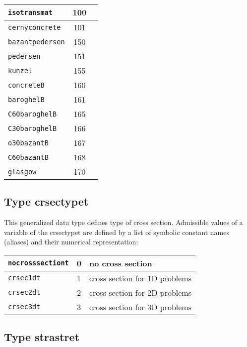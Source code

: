 \begin{center}
\begin{tabular}{|l|c|l|}
\hline
{\tt isotransmat} & 100 &
\\ \hline
{\tt cernyconcrete} & 101 &
\\ \hline
{\tt bazantpedersen} & 150 &
\\ \hline
{\tt pedersen} & 151 &
\\ \hline
{\tt kunzel} & 155 &
\\ \hline
{\tt concreteB} & 160 &
\\ \hline
{\tt baroghelB} & 161 &
\\ \hline
{\tt C60baroghelB} & 165 &
\\ \hline
{\tt C30baroghelB} & 166 &
\\ \hline
{\tt o30bazantB} & 167 &
\\ \hline
{\tt C60bazantB} & 168 &
\\ \hline
{\tt glasgow} & 170 &
\\ \hline
\end{tabular}
\end{center}


\subsection{Type {\sf crsectypet}}
\label{sectcrsectypet}

This generalized data type defines type of cross section.
Admissible values of a variable of the {\sf crsectypet} are defined by a list of symbolic constant names (aliases)
and their numerical representation:

\begin{center}
\begin{tabular}{|l|c|l|}
\hline
{\tt nocrosssectiont} & 0 & no cross section
\\ \hline
{\tt crsec1dt} & 1 & cross section for 1D problems
\\ \hline
{\tt crsec2dt} & 2 & cross section for 2D problems
\\ \hline
{\tt crsec3dt} & 3 & cross section for 3D problems
\\ \hline
\end{tabular}
\end{center}

\subsection{Type {\sf strastret}}
\label{sectstrastret}

